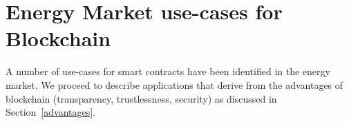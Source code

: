 
 
\section{Energy Market use-cases for Blockchain}

A number of use-cases for smart contracts have been identified in the energy market. We proceed to describe applications that derive from the advantages of blockchain (transparency, trustlessness, security) as discussed in Section~\ref{advantages}.

